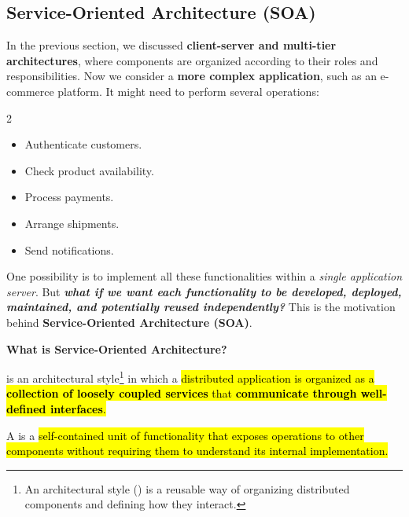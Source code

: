 \subsection{Service-Oriented Architecture (SOA)}\label{sec:modeling--service-oriented-architecture-soa}

In the previous section, we discussed \textbf{client-server and multi-tier architectures}, where components are organized according to their roles and responsibilities. Now we consider a \textbf{more complex application}, such as an e-commerce platform. It might need to perform several operations:
\begin{multicols}{2}
    \begin{itemize}
        \item Authenticate customers.
        \item Check product availability.
        \item Process payments.
        \item Arrange shipments.
        \item Send notifications.
    \end{itemize}
\end{multicols}
\noindent
One possibility is to implement all these functionalities within a \emph{single application server}. But \textbf{\emph{what if we want each functionality to be developed, deployed, maintained, and potentially reused independently?}} This is the motivation behind \textbf{Service-Oriented Architecture (SOA)}.

\highspace
\begin{flushleft}
    \textcolor{Green3}{ \textbf{What is Service-Oriented Architecture?}}
\end{flushleft}
 is an architectural style\footnote{%
    An architectural style () is a reusable way of organizing distributed components and defining how they interact.
} in which a \hl{distributed application is organized as a \textbf{collection of loosely coupled services} that \textbf{communicate through well-defined interfaces}.}

\highspace
A  is a \hl{self-contained unit of functionality that exposes operations to other components without requiring them to understand its internal implementation.}

